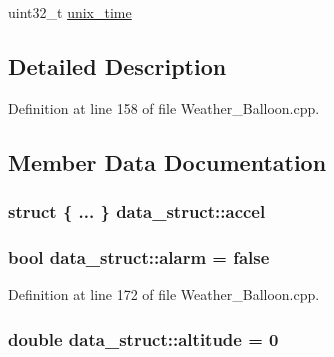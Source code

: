 \begin{DoxyCompactItemize}
\begin{tabbing}
\end{tabbing}\item 
uint32\+\_\+t \hyperlink{structdata__struct_a37f7a481de32f77f428f03c07d60090e}{unix\+\_\+time}
\end{DoxyCompactItemize}


\subsection{Detailed Description}


Definition at line 158 of file Weather\+\_\+\+Balloon.\+cpp.



\subsection{Member Data Documentation}
\subsubsection[{\texorpdfstring{accel}{accel}}]{\setlength{\rightskip}{0pt plus 5cm}struct \{ ... \}   data\+\_\+struct\+::accel}\hypertarget{structdata__struct_a3fca2ed772020080d3e4c2311a240933}{}\label{structdata__struct_a3fca2ed772020080d3e4c2311a240933}
\subsubsection[{\texorpdfstring{alarm}{alarm}}]{\setlength{\rightskip}{0pt plus 5cm}bool data\+\_\+struct\+::alarm = false}\hypertarget{structdata__struct_a6882559eb75dfd48ce00d14c2a82121c}{}\label{structdata__struct_a6882559eb75dfd48ce00d14c2a82121c}


Definition at line 172 of file Weather\+\_\+\+Balloon.\+cpp.

\subsubsection[{\texorpdfstring{altitude}{altitude}}]{\setlength{\rightskip}{0pt plus 5cm}double data\+\_\+struct\+::altitude = 0}\hypertarget{structdata__struct_ab43395cbff83af7b8edfc812f8727b37}{}\label{structdata__struct_ab43395cbff83af7b8edfc812f8727b37}


